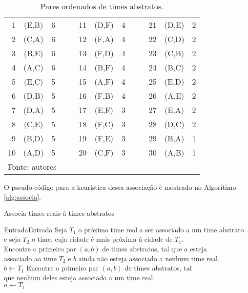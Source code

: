 \documentclass[12pt,a4paper]{article}
\makeatletter
\renewcommand*{\arraystretch}{1.2}
\newcommand{\algorithmfootnote}[2][\footnotesize]{%
	\let\old@algocf@finish\@algocf@finish%
	\def\@algocf@finish{\old@algocf@finish%
		\leavevmode\rlap{\begin{minipage}{\linewidth}
				#1#2
		\end{minipage}}%
	}%
}
\numberwithin{figure}{section}
\numberwithin{table}{section}
\makeatother
\begin{document}
\begin{table}[H]
	\renewcommand{\arraystretch}{1}
	\centering
	\caption{Pares ordenados de times abstratos.}
	\label{tab:abstratos}
	\begin{tabular}{rcc c|c rcc c|c rcc}
		\toprule
		 1 & (E,B) & 6 &&& 11 & (D,F) & 4 &&& 21 & (D,E) & 2 \\
		 2 & (C,A) & 6 &&& 12 & (F,A) & 4 &&& 22 & (C,D) & 2 \\
		 3 & (B,E) & 6 &&& 13 & (F,D) & 4 &&& 23 & (C,B) & 2 \\
		 4 & (A,C) & 6 &&& 14 & (B,F) & 4 &&& 24 & (B,C) & 2 \\
		 5 & (E,C) & 5 &&& 15 & (A,F) & 4 &&& 25 & (E,D) & 2 \\
		 6 & (D,B) & 5 &&& 16 & (F,B) & 4 &&& 26 & (A,E) & 2 \\
		 7 & (D,A) & 5 &&& 17 & (E,F) & 3 &&& 27 & (E,A) & 2 \\
		 8 & (C,E) & 5 &&& 18 & (F,C) & 3 &&& 28 & (D,C) & 2 \\
		 9 & (B,D) & 5 &&& 19 & (F,E) & 3 &&& 29 & (B,A) & 1 \\
		10 & (A,D) & 5 &&& 20 & (C,F) & 3 &&& 30 & (A,B) & 1 \\
		\bottomrule
		\multicolumn{13}{l}{\footnotesize Fonte: autores}
	\end{tabular}
\end{table}

O pseudo-código para a heurística dessa associação é mostrado no Algorítimo \ref{alg:associa}.

\vspace{0.5cm}
\begin{algorithm}[H]
	\caption{Associa times reais à times abstratos}
	\algorithmfootnote{Fonte: \citeauthor{marcio:jogos}}
	\label{alg:associa}
	Entrada{Entrada}
	 {
		Seja $T_{1}$ o próximo time real a ser associado a um time abstrato\\
		e seja $T_{2}$ o time, cuja cidade é mais próxima à cidade de $T_{1}$.\\
		 {
			Encontre o primeiro par $(a,b)$ de times abstratos, tal que $a$ esteja\\
			associado ao time $T_{2}$ e $b$ ainda não esteja associado a nenhum time real.\\
			$b \leftarrow T_{1}$ }
		{ Encontre o primeiro par $(a,b)$ de times abstratos, tal\\
			que nenhum deles esteja associado a um time real.\\
			$a \leftarrow T_{1}$ } }
\end{algorithm}
\vspace{0.5cm}
\end{document}
